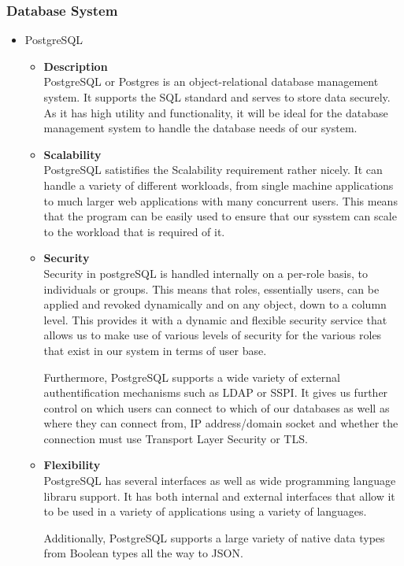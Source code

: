 \documentclass[a4paper,10pt]{article}
\begin{document}
\subsubsection{Database System}
	\begin{itemize}
		\item PostgreSQL
			\begin{itemize}
				\item \textbf{Description}\\
				PostgreSQL or Postgres is an object-relational database management system. It supports the SQL standard and serves to store data securely.
				As it has high utility and functionality, it will be ideal for the database management system to handle the database needs of our system.
				\item \textbf{Scalability}\\
				PostgreSQL satistifies the Scalability requirement rather nicely. It can handle a variety of different workloads, from single machine applications to much larger web applications with many concurrent users. This means that the program can be easily used to ensure that our sysstem can scale to the workload that is required of it.
				\item \textbf{Security}\\
				Security in postgreSQL is handled internally on a per-role basis, to individuals or groups. This means that roles, essentially users, can be applied and revoked dynamically and on any object, down to a column level. This provides it with a dynamic and flexible security service that allows us to make use of various levels of security for the various roles that exist in our system in terms of user base.

				Furthermore, PostgreSQL supports a wide variety of external authentification mechanisms such as LDAP or SSPI. It gives us further control on which users can connect to which of our databases as well as where they can connect from, IP address/domain socket and whether the connection must use Transport Layer Security or TLS.
				\item \textbf{Flexibility}\\
				PostgreSQL has several interfaces as well as wide programming language libraru support. It has both internal and external interfaces that allow it to be used in a variety of applications using a variety of languages.

				Additionally, PostgreSQL supports a large variety of native data types from Boolean types all the way to JSON.


\end{itemize}
\end{itemize}
\end{document}
